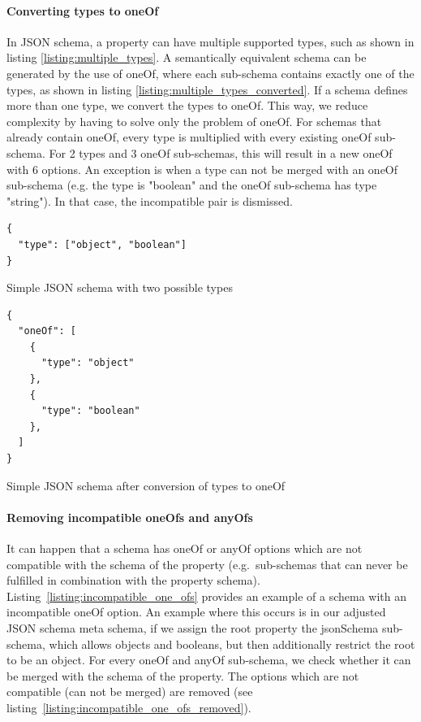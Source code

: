 \paragraph{Converting types to oneOf}
In JSON schema, a property can have multiple supported types, such as shown in listing \ref{listing:multiple_types}.
A semantically equivalent schema can be generated by the use of oneOf, where each sub-schema contains exactly one of the types, as shown in listing \ref{listing:multiple_types_converted}.
If a schema defines more than one type, we convert the types to oneOf. This way, we reduce complexity by having to solve only the problem of oneOf.
For schemas that already contain oneOf, every type is multiplied with every existing oneOf sub-schema.
For 2 types and 3 oneOf sub-schemas, this will result in a new oneOf with 6 options.
An exception is when a type can not be merged with an oneOf sub-schema (e.g. the type is "boolean" and the oneOf sub-schema has type "string").
In that case, the incompatible pair is dismissed.

\begin{listing}[!h]
    \begin{verbatim}
{
  "type": ["object", "boolean"]
}
    \end{verbatim}
    \caption{Simple JSON schema with two possible types}
    \label{listing:multiple_types}
\end{listing}

\begin{listing}[!h]
    \begin{verbatim}
{
  "oneOf": [
    {
      "type": "object"
    },
    {
      "type": "boolean"
    },
  ]
}

    \end{verbatim}

    \caption{Simple JSON schema after conversion of types to oneOf}
    \label{listing:multiple_types_converted}
\end{listing}


\paragraph{Removing incompatible oneOfs and anyOfs}
It can happen that a schema has oneOf or anyOf options which are not compatible with the schema of the property (e.g.\ sub-schemas that can never be fulfilled in combination with the property schema).
Listing~\ref{listing:incompatible_one_ofs} provides an example of a schema with an incompatible oneOf option.
An example where this occurs is in our adjusted JSON schema meta schema, if we assign the root property the jsonSchema sub-schema, which allows objects and booleans, but then additionally restrict the root to be an object.
For every oneOf and anyOf sub-schema, we check whether it can be merged with the schema of the property.
The options which are not compatible (can not be merged) are removed (see listing~\ref{listing:incompatible_one_ofs_removed}).

